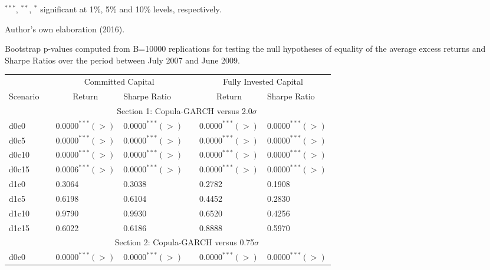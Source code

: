 \documentclass[a4paper,12pt]{report}
\begin{document}
\begin{threeparttable}[H]
\begin{tablenotes}
		\item \scriptsize $^{\ast\ast\ast}$, $^{\ast\ast}$, $^{\ast}$ significant at 1\%, 5\% and 10\% levels, respectively.
		\item Author's own elaboration (2016).
	\end{tablenotes}
	\label{tab:table207}%
\end{threeparttable}%

\vspace{1.0cm}

\begin{threeparttable}[H]
	\centering \scriptsize
	\caption{Bootstrap p-values computed from B=10000 replications for testing the null hypotheses of equality of the average excess returns and Sharpe Ratios over the period between July 2007 and June 2009.}
	\begin{tabularx}{\textwidth}{@{\extracolsep{\fill}}lllllll@{}}
		\toprule
		& & \multicolumn{2}{c}{Committed Capital} & \multicolumn{1}{c}{} & \multicolumn{2}{c}{Fully Invested Capital} \\
		\cmidrule{3-4}  \cmidrule{6-7}
		\multicolumn{1}{c}{Scenario} & & \multicolumn{1}{c}{Return} & Sharpe Ratio &       & \multicolumn{1}{c}{Return}& Sharpe Ratio \\
		\midrule
		& \multicolumn{6}{c}{Section 1: Copula-GARCH versus 2.0$\sigma$} \\
		\midrule
		d0c0 & & $0.0000^{***}(>)$ & $0.0000^{***}(>)$ &       & $0.0000^{***}(>)$ & $0.0000^{***}(>)$ \\
		d0c5 & & $0.0000^{***}(>)$ & $0.0000^{***}(>)$ &       & $0.0000^{***}(>)$ & $0.0000^{***}(>)$   \\
		d0c10 & & $0.0000^{***}(>)$ & $0.0000^{***}(>)$ &       & $0.0000^{***}(>)$ & $0.0000^{***}(>)$ \\
		d0c15 & & $0.0006^{***}(>)$ & $0.0000^{***}(>)$ &       & $0.0000^{***}(>)$ & $0.0000^{***}(>)$ \\
		d1c0 & & 0.3064 & 0.3038  &       & 0.2782 & 0.1908 \\
		d1c5 & & 0.6198 & 0.6104 &       & 0.4452 & 0.2830 \\
		d1c10 & & 0.9790 & 0.9930  &       & 0.6520 & 0.4256 \\
		d1c15 & & 0.6022 & 0.6186 &       & 0.8888 & 0.5970 \\
		\midrule
		& \multicolumn{6}{c}{Section 2: Copula-GARCH versus 0.75$\sigma$} \\
		\midrule
		d0c0 & & $0.0000^{***}(>)$ & $0.0000^{***}(>)$ &       & $0.0000^{***}(>)$ & $0.0000^{***}(>)$ \\

\end{tabularx}
\end{threeparttable}
\end{document}
